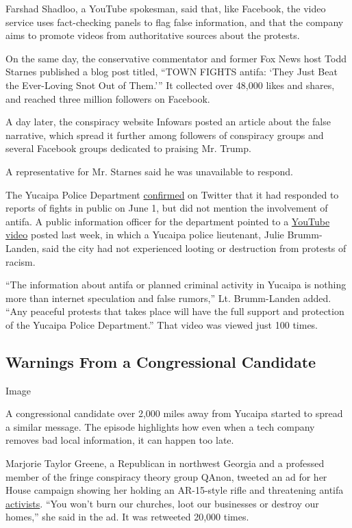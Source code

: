 Farshad Shadloo, a YouTube spokesman, said that, like Facebook, the
video service uses fact-checking panels to flag false information, and
that the company aims to promote videos from authoritative sources about
the protests.

On the same day, the conservative commentator and former Fox News host
Todd Starnes published a blog post titled, ``TOWN FIGHTS antifa: `They
Just Beat the Ever-Loving Snot Out of Them.''' It collected over 48,000
likes and shares, and reached three million followers on Facebook.

A day later, the conspiracy website Infowars posted an article about the
false narrative, which spread it further among followers of conspiracy
groups and several Facebook groups dedicated to praising Mr. Trump.

A representative for Mr. Starnes said he was unavailable to respond.

The Yucaipa Police Department
\href{https://twitter.com/YucaipaPD/status/1267979797059133440}{confirmed}
on Twitter that it had responded to reports of fights in public on June
1, but did not mention the involvement of antifa. A public information
officer for the department pointed to a
\href{https://www.youtube.com/watch?v=KeSiWIbNXEY\&feature=youtu.be}{YouTube
video} posted last week, in which a Yucaipa police lieutenant, Julie
Brumm-Landen, said the city had not experienced looting or destruction
from protests of racism.

``The information about antifa or planned criminal activity in Yucaipa
is nothing more than internet speculation and false rumors,'' Lt.
Brumm-Landen added. ``Any peaceful protests that takes place will have
the full support and protection of the Yucaipa Police Department.'' That
video was viewed just 100 times.

\hypertarget{warnings-from-a-congressional-candidate}{%
\subsection{Warnings From a Congressional
Candidate}\label{warnings-from-a-congressional-candidate}}

Image

A congressional candidate over 2,000 miles away from Yucaipa started to
spread a similar message. The episode highlights how even when a tech
company removes bad local information, it can happen too late.

Marjorie Taylor Greene, a Republican in northwest Georgia and a
professed member of the fringe conspiracy theory group QAnon, tweeted an
ad for her House campaign showing her holding an AR-15-style rifle and
threatening antifa
\href{https://www.nytimes.com/2020/06/11/us/antifa-protests-george-floyd.html}{activists}.
``You won't burn our churches, loot our businesses or destroy our
homes,'' she said in the ad. It was retweeted 20,000 times.

